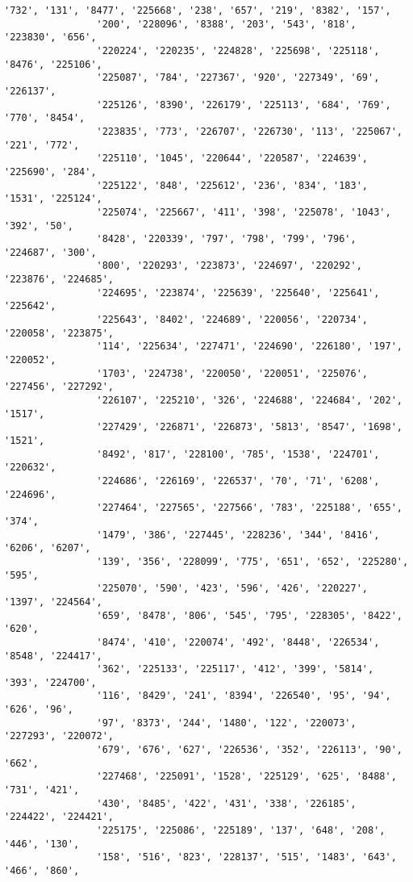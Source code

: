 \documentclass[11pt]{article}
\begin{document}
\begin{Verbatim}[commandchars=\\\{\}]
                '732', '131', '8477', '225668', '238', '657', '219', '8382', '157',
                '200', '228096', '8388', '203', '543', '818', '223830', '656',
                '220224', '220235', '224828', '225698', '225118', '8476', '225106',
                '225087', '784', '227367', '920', '227349', '69', '226137',
                '225126', '8390', '226179', '225113', '684', '769', '770', '8454',
                '223835', '773', '226707', '226730', '113', '225067', '221', '772',
                '225110', '1045', '220644', '220587', '224639', '225690', '284',
                '225122', '848', '225612', '236', '834', '183', '1531', '225124',
                '225074', '225667', '411', '398', '225078', '1043', '392', '50',
                '8428', '220339', '797', '798', '799', '796', '224687', '300',
                '800', '220293', '223873', '224697', '220292', '223876', '224685',
                '224695', '223874', '225639', '225640', '225641', '225642',
                '225643', '8402', '224689', '220056', '220734', '220058', '223875',
                '114', '225634', '227471', '224690', '226180', '197', '220052',
                '1703', '224738', '220050', '220051', '225076', '227456', '227292',
                '226107', '225210', '326', '224688', '224684', '202', '1517',
                '227429', '226871', '226873', '5813', '8547', '1698', '1521',
                '8492', '817', '228100', '785', '1538', '224701', '220632',
                '224686', '226169', '226537', '70', '71', '6208', '224696',
                '227464', '227565', '227566', '783', '225188', '655', '374',
                '1479', '386', '227445', '228236', '344', '8416', '6206', '6207',
                '139', '356', '228099', '775', '651', '652', '225280', '595',
                '225070', '590', '423', '596', '426', '220227', '1397', '224564',
                '659', '8478', '806', '545', '795', '228305', '8422', '620',
                '8474', '410', '220074', '492', '8448', '226534', '8548', '224417',
                '362', '225133', '225117', '412', '399', '5814', '393', '224700',
                '116', '8429', '241', '8394', '226540', '95', '94', '626', '96',
                '97', '8373', '244', '1480', '122', '220073', '227293', '220072',
                '679', '676', '627', '226536', '352', '226113', '90', '662',
                '227468', '225091', '1528', '225129', '625', '8488', '731', '421',
                '430', '8485', '422', '431', '338', '226185', '224422', '224421',
                '225175', '225086', '225189', '137', '648', '208', '446', '130',
                '158', '516', '823', '228137', '515', '1483', '643', '466', '860',

\end{Verbatim}
\end{document}
